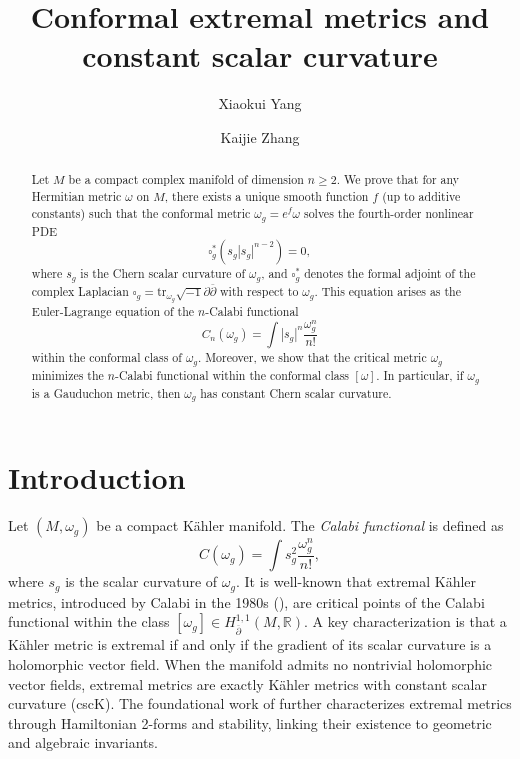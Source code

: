 \documentclass[12pt]{amsart}
\title{Conformal extremal metrics and constant  scalar curvature}
\author{Xiaokui Yang}
\author{Kaijie Zhang}
\newcommand\bp{{\bar\partial}}
\theoremstyle{plain}
\theoremstyle{definition}
\newcommand{\sq}{\sqrt{-1}}
\newcommand{\p}{\partial}
\renewcommand{\bar}{\overline}
\renewcommand{\bp}{\bar{\partial}}
\renewcommand{\>}{\rightarrow}
\newcommand{\R}{{\mathbb R}}
\renewcommand{\#}{\sharp}
\numberwithin{equation}{section} %
\begin{document}
    \begin{abstract} Let $M$ be a compact complex manifold of dimension $n\geq 2$. We prove that for any Hermitian metric $\omega$ on $M$, there exists a unique smooth function $f$ (up to additive constants) such that the conformal metric $\omega_g =e^f \omega$ solves the fourth-order nonlinear PDE
        $$\square_g^*(s_g|s_g|^{n-2})=0,$$
        where $s_g$ is the Chern scalar curvature of $\omega_g$, and $\square_g^*$ denotes the formal adjoint of the complex Laplacian $\square_g=\mathrm{tr}_{\omega_g}\sq\p\bar\p$ with respect to $\omega_g$. This equation arises as the Euler-Lagrange equation of the $n$-Calabi functional
        $$C_{n}(\omega_g)=\int |s_g|^n\frac{\omega_g^n}{n!}$$ within the conformal class of $\omega_g$.    Moreover, we show that  the critical metric $\omega_g$ minimizes the $n$-Calabi functional within the conformal class $[\omega]$. In particular,
        if   $\omega_g$ is a Gauduchon metric, then $\omega_g$ has constant Chern scalar curvature.
    \end{abstract}


    \maketitle



    \section{Introduction}

Let $(M,\omega_g)$ be a compact K\"ahler manifold.  The \textit{Calabi functional} is defined as
    $$
    C(\omega_g)=\int s_g^2\frac{\omega_g^n}{n!},$$
    where $s_g$ is the scalar curvature of $\omega_g$.
It is well-known that extremal K\"ahler metrics, introduced by Calabi in the 1980s (\cite{Calabi1982}),
are critical points of the Calabi functional within the class $[\omega_g]\in H^{1,1}_{\bp}(M,\R)$.
A key characterization is that a K\"ahler metric is extremal
if and only if the gradient of its scalar curvature is a holomorphic vector field.
When the manifold admits no nontrivial holomorphic vector fields, extremal metrics
 are exactly K\"ahler metrics with constant scalar curvature (cscK).
 The foundational work of \cite{ACGC2008} further characterizes extremal metrics
 through Hamiltonian 2-forms and stability, linking their existence to geometric and algebraic invariants.\\
\end{document}
